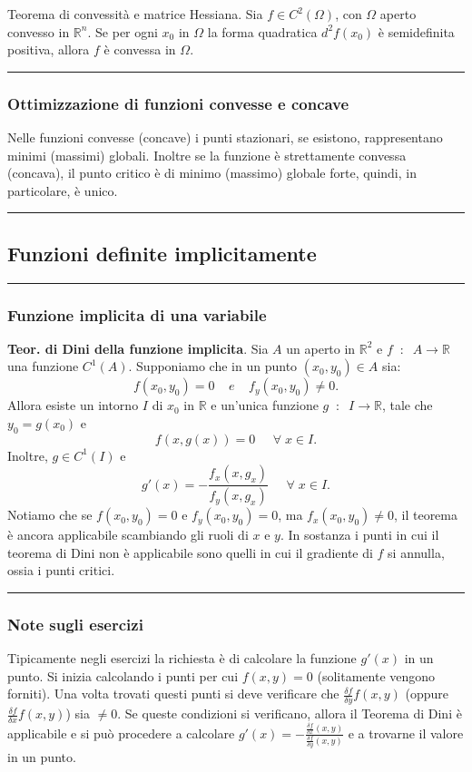 Teorema di convessità e matrice Hessiana. Sia $f \in C^2(\Omega)$, con $\Omega$ aperto convesso in $\mathbb{R}^n$. Se per ogni $x_0$ in $\Omega$ la forma quadratica $d^2f(x_0)$ è semidefinita positiva, allora $f$ è convessa in $\Omega$. \newline
\rule{\textwidth}{0.4pt}
\subsubsection{Ottimizzazione di funzioni convesse e concave}
Nelle funzioni convesse (concave) i punti stazionari, se esistono, rappresentano minimi (massimi) globali. Inoltre se la funzione è strettamente convessa (concava), il punto critico è di minimo (massimo) globale forte, quindi, in particolare, è unico. \newline
\rule{\textwidth}{2pt}
\subsection{Funzioni definite implicitamente}
\rule{\textwidth}{0.4pt}
\subsubsection{Funzione implicita di una variabile}
\textbf{Teor. di Dini della funzione implicita}. Sia $A$ un aperto in $\mathbb{R}^2$ e $f \;\;:\;\; A \rightarrow \mathbb{R}$ una funzione $C^1(A)$. Supponiamo che in un punto $(x_0,y_0) \in A$ sia:
\[
    f(x_0,y_0)= 0 \;\;\;\; e \;\;\;\; f_y(x_0,y_0) \neq 0.
\] 
Allora esiste un intorno $I$ di $x_0$ in $\mathbb{R}$ e un'unica funzione $g \;\;:\;\; I \rightarrow \mathbb{R}$, tale che $y_0=g(x_0)$ e
\[
    f(x,g(x)) = 0 \;\;\;\; \;\forall\;x \in I.
\]
Inoltre, $g \in C^1(I)$ e 
\[
    g'(x) = - \frac{f_x(x,g_x)}{f_y(x,g_x)} \;\;\;\; \;\forall\;x \in I.
\]
Notiamo che se $f(x_0,y_0) = 0$ e $f_y(x_0, y_0) = 0$, ma $f_x(x_0, y_0) \neq 0$, il teorema è ancora applicabile scambiando gli ruoli di $x$ e $y$.\newline
In sostanza i punti in cui il teorema di Dini non è applicabile sono quelli in cui il gradiente di $f$ si annulla, ossia i punti critici. \newline
\rule{\textwidth}{0.4pt}
\subsubsection{Note sugli esercizi}
Tipicamente negli esercizi la richiesta è di calcolare la funzione $g'(x)$ in un punto. Si inizia calcolando i punti per cui $f(x,y) = 0$ (solitamente vengono forniti). Una volta trovati questi punti si deve verificare che $\frac{\delta f}{\delta y} f(x,y)$ (oppure $\frac{\delta f}{\delta x} f(x,y)$) sia $\neq 0$. Se queste condizioni si verificano, allora il Teorema di Dini è applicabile e si può procedere a calcolare $g'(x) = - \frac{\frac{\delta f}{\delta x}(x,y)}{\frac{\delta f}{\delta y} (x,y)}$ e a trovarne il valore in un punto.\newline

